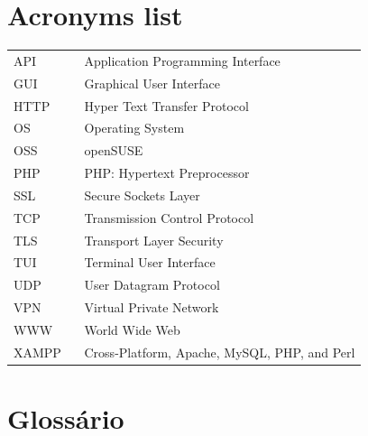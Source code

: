 \documentclass[11pt,a4paper]{report}
\begin{document}
\listoffigures
{}


\listoftables
{}

\chapter*{Acronyms list}

\begin{flushleft}
\begin{tabular}{l p{0.8\linewidth}}
    API     & Application Programming Interface\\
    GUI     & Graphical User Interface\\
    HTTP    & Hyper Text Transfer Protocol\\
    OS      & Operating System\\
    OSS     & openSUSE\\
    PHP     & PHP: Hypertext Preprocessor\\
    SSL     & Secure Sockets Layer\\
    TCP     & Transmission Control Protocol\\
    TLS     & Transport Layer Security\\
    TUI     & Terminal User Interface\\ %
    UDP     & User Datagram Protocol\\
    VPN     & Virtual Private Network\\
    WWW     & World Wide Web\\
    XAMPP   & Cross-Platform, Apache, MySQL, PHP, and Perl
\end{tabular}
\end{flushleft}

\chapter*{Glossário}
\end{document}
